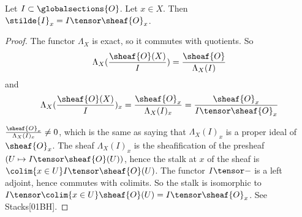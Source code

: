 \begin{lemma}[Stalks]
Let $I \subset \globalsections{O}$.
Let $x\in X$.
Then $\stilde{I}_x = I\tensor \sheaf{O}_x$.
\end{lemma}

\begin{proof}
The functor $\Lambda_X$ is exact, so it commutes with quotients.
So
\[\Lambda_X(\frac{\sheaf{O}(X)}{I}) = \frac{\sheaf{O}}{\Lambda_X(I)}\]
and 
\[\Lambda_X(\frac{\sheaf{O}(X)}{I})_x = \frac{\sheaf{O}_x}{\Lambda_X(I)_x} = \frac{\sheaf{O}_x}{I\tensor \sheaf{O}_x} \]

$\frac{\sheaf{O}_x}{\Lambda_X(I)_x} \neq 0$, which is the same as saying that  $\Lambda_X(I)_x$ is a proper ideal of $\sheaf{O}_x$. 
The sheaf $\Lambda_X(I)_x$ is the sheafification of the presheaf $(U \mapsto I \tensor \sheaf{O}(U))$, hence the stalk at $x$ of the sheaf is 
$\colim{x \in U} I\tensor \sheaf{O}(U)$. The functor $I\tensor -$ is a left adjoint, hence commutes with colimits.
So the stalk is isomorphic to $I\tensor \colim{x\in U} \sheaf{O}(U)= I\tensor \sheaf{O}_x$. See Stacks[01BH].
\end{proof}